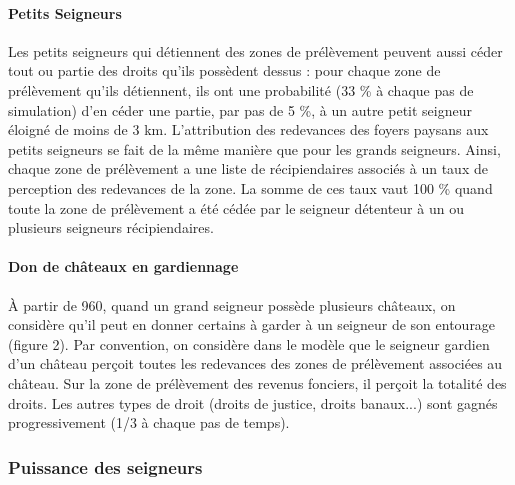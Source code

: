 \paragraph{Petits Seigneurs}
Les petits seigneurs qui détiennent des zones de prélèvement peuvent aussi céder tout ou partie des droits qu'ils possèdent dessus :
pour chaque zone de prélèvement qu'ils détiennent, ils ont une probabilité (33 \% à chaque pas de simulation) d'en céder une partie, par pas de 5 \%, à un autre petit seigneur éloigné de moins de 3 km.
L'attribution des redevances des foyers paysans aux petits seigneurs se fait de la même manière que pour les grands seigneurs.
Ainsi, chaque zone de prélèvement a une liste de récipiendaires associés à un taux de perception des redevances de la zone.
La somme de ces taux vaut 100 \% quand toute la zone de prélèvement a été cédée par le seigneur détenteur à un ou plusieurs seigneurs récipiendaires.

\paragraph{Don de châteaux en gardiennage}
À partir de 960, quand un grand seigneur possède plusieurs châteaux, on considère qu'il peut en donner certains à garder à un seigneur de son entourage (figure 2).
Par convention, on considère dans le modèle que le seigneur gardien d'un château perçoit toutes les redevances des zones de prélèvement associées au
château.
Sur la zone de prélèvement des revenus fonciers, il perçoit la totalité des droits.
Les autres types de droit (droits de justice, droits banaux...) sont gagnés progressivement (1/3 à chaque pas de temps).

\subsubsection{Puissance des seigneurs}

